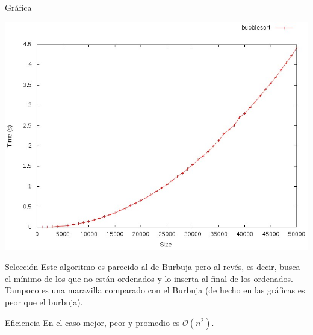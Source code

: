 \documentclass[compress]{beamer}
\begin{document}
\begin{frame}{Gráfica}
	\begin{alertblock}{}
		\begin{center}
		\includegraphics[scale=0.40]{images/bubblesort.jpeg}
		\end{center}
	\end{alertblock}
\end{frame}

\begin{frame}{Selección}
Este algoritmo es parecido al de Burbuja pero al revés, es decir, busca el mínimo de los que no están ordenados y lo inserta al final de los ordenados.\\
\vspace{0.20in}
Tampoco es una maravilla comparado con el Burbuja (de hecho en las gráficas es peor que el burbuja).\\
\vspace{0.20in}
	\begin{block}{Eficiencia}
	En el caso mejor, peor y promedio es $\mathcal{O}(n^2)$.
	\end{block}
\end{frame}
\end{document}
